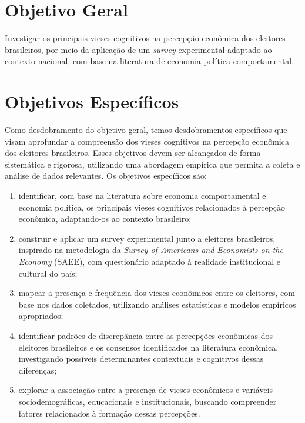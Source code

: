 \section{Objetivo Geral}

Investigar os principais vieses cognitivos na percepção econômica dos eleitores brasileiros, por meio da aplicação de um \textit{survey} experimental adaptado ao contexto nacional, com base na literatura de economia política comportamental.

\section{Objetivos Específicos}


Como desdobramento do objetivo geral, temos desdobramentos específicos que visam aprofundar a compreensão dos vieses cognitivos na percepção econômica dos eleitores brasileiros. Esses objetivos devem ser alcançados de forma sistemática e rigorosa, utilizando uma abordagem empírica que permita a coleta e análise de dados relevantes. Os objetivos específicos são:

\begin{enumerate}[label=\alph*)]
    \item identificar, com base na literatura sobre economia comportamental e economia política, os principais vieses cognitivos relacionados à percepção econômica, adaptando-os ao contexto brasileiro;

    \item construir e aplicar um survey experimental junto a eleitores brasileiros, inspirado na metodologia da \textit{Survey of Americans and Economists on the Economy} (SAEE), com questionário adaptado à realidade institucional e cultural do país;

    \item mapear a presença e frequência dos vieses econômicos entre os eleitores, com base nos dados coletados, utilizando análises estatísticas e modelos empíricos apropriados;

    \item identificar padrões de discrepância entre as percepções econômicas dos eleitores brasileiros e os consensos identificados na literatura econômica, investigando possíveis determinantes contextuais e cognitivos dessas diferenças;

    \item explorar a associação entre a presença de vieses econômicos e variáveis sociodemográficas, educacionais e institucionais, buscando compreender fatores relacionados à formação dessas percepções.


\end{enumerate}

